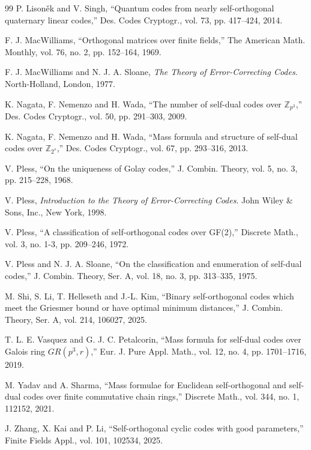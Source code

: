 \documentclass{article}
\theoremstyle{definition}
\theoremstyle{remark}
\begin{document}
\begin{thebibliography}{99}
 P. Lison\v{e}k and V. Singh, “Quantum codes from nearly self-orthogonal quaternary linear codes,” Des. Codes Cryptogr., vol. 73, pp. 417--424, 2014.

 F. J. MacWilliams, “Orthogonal matrices over finite fields,” The American Math. Monthly, vol. 76, no. 2, pp. 152--164, 1969.

 F. J. MacWilliams and N. J. A. Sloane, {\it The Theory of Error-Correcting Codes}. North-Holland, London, 1977.

 K. Nagata, F. Nemenzo and H. Wada, “The number of self-dual codes over $\mathbb{Z}_{p^3}$,” Des. Codes Cryptogr., vol. 50, pp. 291--303, 2009.

 K. Nagata, F. Nemenzo and H. Wada, “Mass formula and structure of self-dual codes over $\mathbb{Z}_{2^s}$,” Des. Codes Cryptogr., vol. 67, pp. 293--316, 2013.

 V. Pless, “On the uniqueness of Golay codes,” J. Combin. Theory, vol. 5, no. 3, pp. 215--228, 1968.

 V. Pless, {\it Introduction to the Theory of Error-Correcting Codes}. John Wiley \& Sons, Inc., New York, 1998.

 V. Pless, “A classification of self-orthogonal codes over GF(2),” Discrete Math., vol. 3, no. 1-3, pp. 209--246, 1972.

 V. Pless and N. J. A. Sloane, “On the classification and enumeration of self-dual codes,” J. Combin. Theory, Ser. A, vol. 18, no. 3, pp. 313--335, 1975.

 M. Shi, S. Li, T. Helleseth and J.-L. Kim, “Binary self-orthogonal codes which meet the Griesmer bound or have optimal minimum distances,” J. Combin. Theory, Ser. A, vol. 214, 106027, 2025.

 T. L. E. Vasquez and G. J. C. Petalcorin, “Mass formula for self-dual codes over Galois ring $GR(p^3, r)$,” Eur. J. Pure Appl. Math., vol. 12, no. 4, pp. 1701--1716, 2019.

 M. Yadav and A. Sharma, “Mass formulae for Euclidean self-orthogonal and self-dual codes over finite commutative chain rings,” Discrete Math., vol. 344, no. 1, 112152, 2021.

 J. Zhang, X. Kai and P. Li, “Self-orthogonal cyclic codes with good parameters,” Finite Fields Appl., vol. 101, 102534, 2025.

\end{thebibliography}
\end{document}
